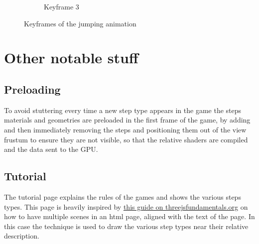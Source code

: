 \documentclass[12pt]{article}
\begin{document}
\begin{figure}[h]
\begin{subfigure}{.33\textwidth}
  \caption{Keyframe 3}
  \label{fig:key3}
 \end{subfigure}
\caption{Keyframes of the jumping animation}
\label{fig:keyframes}
\end{figure}

\newpage

\section{Other notable stuff}

\subsection{Preloading}
To avoid stuttering every time a new step type appears in the game the steps materials and geometries are preloaded in the first frame of the game, by adding and then immediately removing the steps and positioning them out of the view frustum to ensure they are not visible, so that the relative shaders are compiled and the data sent to the GPU.

\subsection{Tutorial}
The tutorial page explains the rules of the games and shows the various steps types. This page is heavily inspired by \href{https://threejsfundamentals.org/threejs/lessons/threejs-multiple-scenes.html}{this guide on threejsfundamentals.org} on how to have multiple scenes in an html page, aligned with the text of the page. In this case the technique is used to draw the various step types near their relative description.
\end{document}
